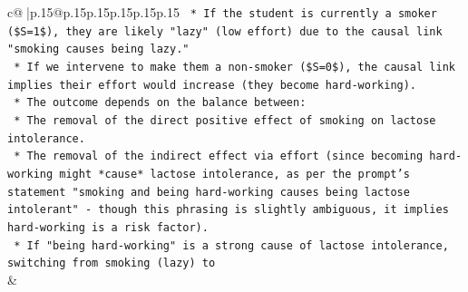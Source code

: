 \documentclass{article}
\begin{document}
{\begin{supertabular}{c@{$\;$}|p{.15\linewidth}@{}p{.15\linewidth}p{.15\linewidth}p{.15\linewidth}p{.15\linewidth}p{.15\linewidth}}
{{{\texttt{    *   If the student is currently a smoker (\$S=1\$), they are likely "lazy" (low effort) due to the causal link "smoking causes being lazy."} \\
\texttt{    *   If we intervene to make them a non{-}smoker (\$S=0\$), the causal link implies their effort would increase (they become hard{-}working).} \\
\texttt{    *   The outcome depends on the balance between:} \\
\texttt{        *   The removal of the direct positive effect of smoking on lactose intolerance.} \\
\texttt{        *   The removal of the indirect effect via effort (since becoming hard{-}working might *cause* lactose intolerance, as per the prompt's statement "smoking and being hard{-}working causes being lactose intolerant" {-} though this phrasing is slightly ambiguous, it implies hard{-}working is a risk factor).} \\
\texttt{    *   If "being hard{-}working" is a strong cause of lactose intolerance, switching from smoking (lazy) to} \\
            }
        }
    }
    & \\ \\


\end{supertabular}}
\end{document}
